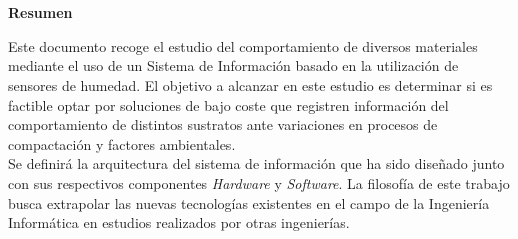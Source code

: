 \thispagestyle{empty}
\newpage

\chapter*{}
\begin{center}
\textbf{Resumen}
\end{center}

Este documento recoge el estudio del comportamiento de diversos materiales mediante el uso de un Sistema de Información basado en la utilización de sensores de humedad. El objetivo a alcanzar en este estudio es determinar si es factible optar por soluciones de bajo coste que registren información del comportamiento de distintos sustratos ante variaciones en procesos de compactación y factores ambientales.\\

Se definirá la arquitectura del sistema de información que ha sido diseñado junto con sus respectivos componentes \textit{Hardware} y \textit{Software}. La filosofía de este trabajo busca extrapolar las nuevas tecnologías existentes en el campo de la Ingeniería Informática en estudios realizados por otras ingenierías.


\thispagestyle{empty}

\newpage
